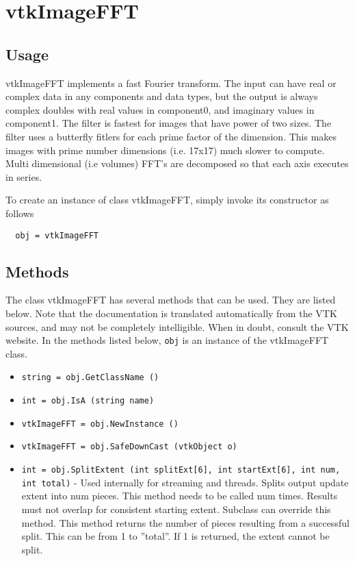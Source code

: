 \section{vtkImageFFT}

\subsection{Usage}

 vtkImageFFT implements a  fast Fourier transform.  The input
 can have real or complex data in any components and data types, but
 the output is always complex doubles with real values in component0, and
 imaginary values in component1.  The filter is fastest for images that
 have power of two sizes.  The filter uses a butterfly fitlers for each
 prime factor of the dimension.  This makes images with prime number dimensions 
 (i.e. 17x17) much slower to compute.  Multi dimensional (i.e volumes) 
 FFT's are decomposed so that each axis executes in series.

To create an instance of class vtkImageFFT, simply
invoke its constructor as follows
\begin{verbatim}
  obj = vtkImageFFT
\end{verbatim}
\subsection{Methods}

The class vtkImageFFT has several methods that can be used.
  They are listed below.
Note that the documentation is translated automatically from the VTK sources,
and may not be completely intelligible.  When in doubt, consult the VTK website.
In the methods listed below, \verb|obj| is an instance of the vtkImageFFT class.
\begin{itemize}
\item  \verb|string = obj.GetClassName ()|

\item  \verb|int = obj.IsA (string name)|

\item  \verb|vtkImageFFT = obj.NewInstance ()|

\item  \verb|vtkImageFFT = obj.SafeDownCast (vtkObject o)|

\item  \verb|int = obj.SplitExtent (int splitExt[6], int startExt[6], int num, int total)| -  Used internally for streaming and threads.  
 Splits output update extent into num pieces.
 This method needs to be called num times.  Results must not overlap for
 consistent starting extent.  Subclass can override this method.
 This method returns the number of pieces resulting from a
 successful split.  This can be from 1 to ''total''.  
 If 1 is returned, the extent cannot be split.

\end{itemize}
